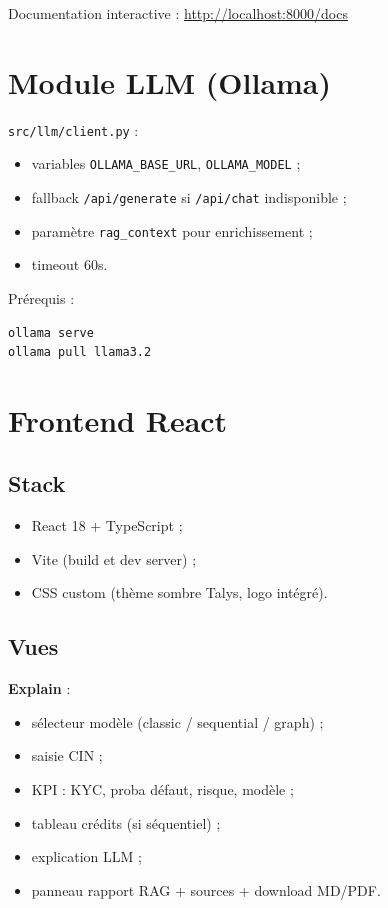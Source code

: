 Documentation interactive : \url{http://localhost:8000/docs}

\section{Module LLM (Ollama)}

\texttt{src/llm/client.py} :
\begin{itemize}[leftmargin=*]
  \item variables \texttt{OLLAMA\_BASE\_URL}, \texttt{OLLAMA\_MODEL} ;
  \item fallback \texttt{/api/generate} si \texttt{/api/chat} indisponible ;
  \item paramètre \texttt{rag\_context} pour enrichissement ;
  \item timeout 60s.
\end{itemize}

Prérequis :
\begin{lstlisting}[caption={Installation Ollama}]
ollama serve
ollama pull llama3.2
\end{lstlisting}

\section{Frontend React}

\subsection{Stack}

\begin{itemize}[leftmargin=*]
  \item React 18 + TypeScript ;
  \item Vite (build et dev server) ;
  \item CSS custom (thème sombre Talys, logo intégré).
\end{itemize}

\subsection{Vues}

\textbf{Explain} :
\begin{itemize}[leftmargin=*]
  \item sélecteur modèle (classic / sequential / graph) ;
  \item saisie CIN ;
  \item KPI : KYC, proba défaut, risque, modèle ;
  \item tableau crédits (si séquentiel) ;
  \item explication LLM ;
  \item panneau rapport RAG + sources + download MD/PDF.
\end{itemize}

